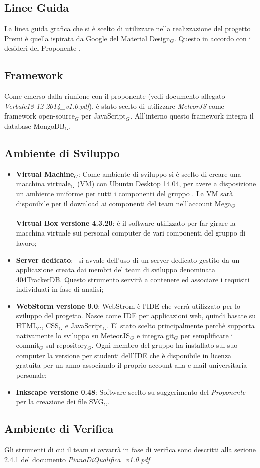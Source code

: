 \subsection{Linee Guida}
La linea guida grafica che si è scelto di utilizzare nella realizzazione del progetto Premi è quella ispirata da Google del Material Design$_G$. Questo in accordo con i desideri del Proponente \Zucchetti.
\subsection{Framework}
Come emerso dalla riunione con il proponente (vedi documento allegato \textit{Verbale18-12-2014\_v1.0.pdf}), è stato scelto di utilizzare \textit{MeteorJS} come framework open-source$_G$ per JavaScript$_G$. All'interno questo framework integra il database MongoDB$_G$.

\subsection{Ambiente di Sviluppo}

\begin{itemize}
	\item \textbf{Virtual Machine$_G$}:
	\smallbreak
	Come ambiente di sviluppo si è scelto di creare una macchina virtuale$_G$ (VM) con Ubuntu Desktop 14.04, per avere a disposizione un ambiente uniforme per tutti i componenti del gruppo \gruppo. La VM sarà disponibile per il download ai componenti del team nell'account Mega$_G$
	\\ \\
	\textbf{Virtual Box versione 4.3.20}: è il software utilizzato per far girare la macchina virtuale sui personal computer de vari componenti del gruppo di lavoro;
	\item \textbf{Server dedicato}:
	\gruppo\ si avvale dell'uso di un server dedicato gestito da un applicazione creata dai membri del team di sviluppo denominata 404TrackerDB. Questo strumento servirà a contenere ed associare i requisiti individuati in fase di analisi;
    \item \textbf{WebStorm versione 9.0}: WebStrom è l'IDE che verrà utilizzato per lo sviluppo del progetto. Nasce come IDE per applicazioni web, quindi basate su HTML$_G$, CSS$_G$ e JavaScript$_G$. E' stato scelto principalmente perchè supporta nativamente lo sviluppo su MeteorJS$_G$ e integra git$_G$ per semplificare i commit$_G$ sul repository$_G$. Ogni membro del gruppo ha installato sul suo computer la versione per studenti dell'IDE che è disponibile in licenza gratuita per un anno associando il proprio account alla e-mail universitaria personale;
    
    \item \textbf{Inkscape versione 0.48}: Software scelto su suggerimento del \textit{Proponente} per la creazione dei file SVG$_G$.
\end{itemize}

\subsection{Ambiente di Verifica}
Gli strumenti di cui il team si avvarrà in fase di verifica sono descritti alla sezione 2.4.1 del documento \textit{PianoDiQualifica\_v1.0.pdf}